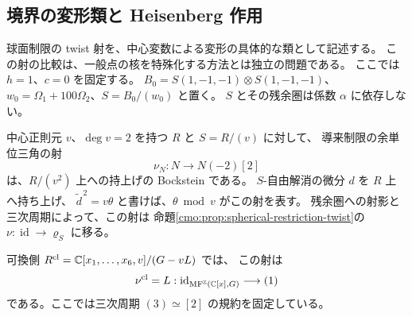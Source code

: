 \subsection{境界の変形類と Heisenberg 作用}
\label{cmo:subsec:spherical-boundary-class}

球面制限の twist 射を、中心変数による変形の具体的な類として記述する。
この射の比較は、一般点の核を特殊化する方法とは独立の問題である。
ここでは $h=1$、$c=0$ を固定する。
$B_0=S(1,-1,-1)\otimes S(1,-1,-1)$、
$w_0=\Omega_1+100\Omega_2$、$S=B_0/(w_0)$ と置く。
$S$ とその残余圏は係数 $\alpha$ に依存しない。

\begin{lemma}
\label{cmo:lem:spherical-bockstein}
中心正則元 $v$、$\deg v=2$ を持つ $R$ と $S=R/(v)$ に対して、
導来制限の余単位三角の射
\[
 \nu_N:N\longrightarrow N(-2)[2]
\]
は、$R/(v^2)$ 上への持上げの Bockstein である。
$S$-自由解消の微分 $d$ を $R$ 上へ持ち上げ、
$\widetilde d^{\,2}=v\theta$ と書けば、$\theta\bmod v$ がこの射を表す。
残余圏への射影と三次周期によって、この射は
命題\ref{cmo:prop:spherical-restriction-twist}の
$\nu:\operatorname{id}\to\varrho_S$ に移る。

可換側 $R^{\mathrm{cl}}=\mathbb C[x_1,\ldots,x_6,v]/(G-vL)$ では、
この射は
\begin{equation}\label{cmo:eq:commutative-twist-linear-class}
 \nu^{\mathrm{cl}}=L:
 \operatorname{id}_{\operatorname{MF}^{\mathbb Z}(\mathbb C[x],G)}
       \longrightarrow (1)
\end{equation}
である。ここでは三次周期 $(3)\simeq[2]$ の規約を固定している。
\end{lemma}


